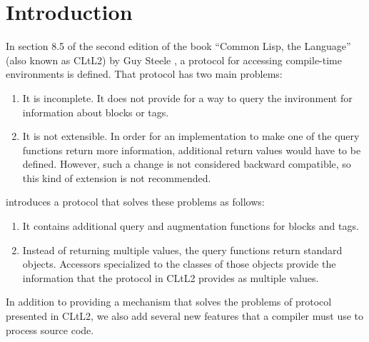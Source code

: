 \chapter{Introduction}
%

In section 8.5 of the second edition of the book ``Common Lisp, the
Language'' (also known as CLtL2) by Guy Steele
\cite{Steele:1990:CLL:95411}, a protocol for accessing compile-time
environments is defined.  That protocol has two main problems:

\begin{enumerate}
\item It is incomplete.  It does not provide for a way to query the
  invironment for information about blocks or tags.
\item It is not extensible.  In order for an implementation to make
  one of the query functions return more information, additional
  return values would have to be defined.  However, such a change is
  not considered backward compatible, so this kind of extension is not
  recommended.
\end{enumerate}

\sysname{} introduces a protocol that solves these problems as
follows:

\begin{enumerate}
\item It contains additional query and augmentation functions for
  blocks and tags.
\item Instead of returning multiple values, the query functions return
  standard objects.  Accessors specialized to the classes of those
  objects provide the information that the protocol in CLtL2
  provides as multiple values.
\end{enumerate}

In addition to providing a mechanism that solves the problems of
protocol presented in CLtL2, we also add several new features that
a compiler must use to process source code.
